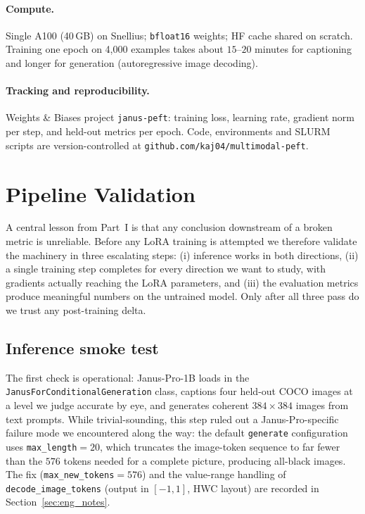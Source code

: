 \paragraph{Compute.} Single A100 (40\,GB) on Snellius; \texttt{bfloat16}
weights; HF cache shared on scratch. Training one epoch on 4{,}000 examples
takes about $15$--$20$ minutes for captioning and longer for generation
(autoregressive image decoding).

\paragraph{Tracking and reproducibility.} Weights \& Biases project
\texttt{janus-peft}: training loss, learning rate, gradient norm per step,
and held-out metrics per epoch. Code, environments and SLURM scripts are
version-controlled at \texttt{github.com/kaj04/multimodal-peft}.

\section{Pipeline Validation}
\label{sec:pipeline_validation}

A central lesson from Part~I is that any conclusion downstream of a broken
metric is unreliable. Before any LoRA training is attempted we therefore
validate the machinery in three escalating steps: (i) inference works in both
directions, (ii) a single training step completes for every direction we want
to study, with gradients actually reaching the LoRA parameters, and (iii) the
evaluation metrics produce meaningful numbers on the untrained model. Only
after all three pass do we trust any post-training delta.

\subsection{Inference smoke test}
\label{sec:smoke}

The first check is operational: Janus-Pro-1B loads in the
\texttt{JanusForConditionalGeneration} class, captions four held-out COCO
images at a level we judge accurate by eye, and generates coherent
$384\times384$ images from text prompts. While trivial-sounding, this step
ruled out a Janus-Pro-specific failure mode we encountered along the way:
the default \texttt{generate} configuration uses \texttt{max\_length}$=20$,
which truncates the image-token sequence to far fewer than the $576$ tokens
needed for a complete picture, producing all-black images. The fix
(\texttt{max\_new\_tokens}$=576$) and the value-range handling of
\texttt{decode\_image\_tokens} (output in $[-1,1]$, HWC layout) are recorded
in Section~\ref{sec:eng_notes}.

